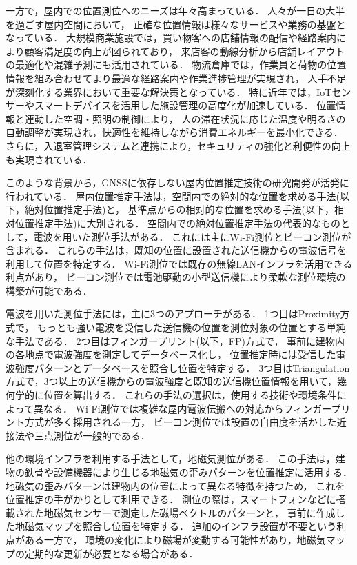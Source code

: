 一方で，屋内での位置測位へのニーズは年々高まっている．
人々が一日の大半を過ごす屋内空間において，
正確な位置情報は様々なサービスや業務の基盤となっている．
大規模商業施設では，買い物客への店舗情報の配信や経路案内により顧客満足度の向上が図られており\cite{burasapo}，
来店客の動線分析から店舗レイアウトの最適化や混雑予測にも活用されている．
物流倉庫では，作業員と荷物の位置情報を組み合わせてより最適な経路案内や作業進捗管理が実現され，
人手不足が深刻化する業界において重要な解決策となっている．
特に近年では，IoTセンサーやスマートデバイスを活用した施設管理の高度化が加速している．
位置情報と連動した空調・照明の制御により，
人の滞在状況に応じた温度や明るさの自動調整が実現され，快適性を維持しながら消費エネルギーを最小化できる．
さらに，入退室管理システムと連携により，セキュリティの強化と利便性の向上も実現されている．

このような背景から，GNSSに依存しない屋内位置推定技術の研究開発が活発に行われている．
屋内位置推定手法は，空間内での絶対的な位置を求める手法(以下，絶対位置推定手法)と，
基準点からの相対的な位置を求める手法(以下，相対位置推定手法)に大別される．
空間内での絶対位置推定手法の代表的なものとして，電波を用いた測位手法がある．
これには主にWi-Fi測位とビーコン測位が含まれる．
これらの手法は，既知の位置に設置された送信機からの電波信号を利用して位置を特定する．
Wi-Fi測位では既存の無線LANインフラを活用できる利点があり，
ビーコン測位では電池駆動の小型送信機により柔軟な測位環境の構築が可能である．

電波を用いた測位手法には，主に3つのアプローチがある．
1つ目はProximity方式で，
もっとも強い電波を受信した送信機の位置を測位対象の位置とする単純な手法である．
2つ目はフィンガープリント(以下，FP)方式で，
事前に建物内の各地点で電波強度を測定してデータベース化し，
位置推定時には受信した電波強度パターンとデータベースを照合し位置を特定する．
3つ目はTriangulation方式で，3つ以上の送信機からの電波強度と既知の送信機位置情報を用いて，幾何学的に位置を算出する．
これらの手法の選択は，使用する技術や環境条件によって異なる．
Wi-Fi測位では複雑な屋内電波伝搬への対応からフィンガープリント方式が多く採用される一方，
ビーコン測位では設置の自由度を活かした近接法や三点測位が一般的である．

他の環境インフラを利用する手法として，地磁気測位がある．
この手法は，建物の鉄骨や設備機器により生じる地磁気の歪みパターンを位置推定に活用する．
地磁気の歪みパターンは建物内の位置によって異なる特徴を持つため，
これを位置推定の手がかりとして利用できる．
測位の際は，スマートフォンなどに搭載された地磁気センサーで測定した磁場ベクトルのパターンと，
事前に作成した地磁気マップを照合し位置を特定する．
追加のインフラ設置が不要という利点がある一方で，
環境の変化により磁場が変動する可能性があり，地磁気マップの定期的な更新が必要となる場合がある．

